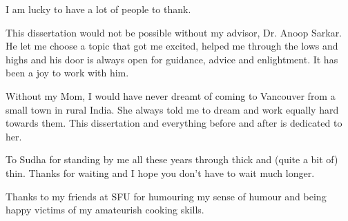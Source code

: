 
%
%


I am lucky to have a lot of people to thank. 

This dissertation would not be possible without my advisor, Dr. Anoop Sarkar. He let me choose a topic that got me excited, helped me through the lows and highs and his door is always open for guidance, advice and enlightment. It has been a joy to work with him. 

Without my Mom, I would have never dreamt of coming to Vancouver from a small town in rural India. She always told me to dream and work equally hard towards them. This dissertation and everything before and after is dedicated to her. 

To Sudha for standing by me all these years through thick and (quite a bit of) thin. Thanks for waiting and I hope you don't have to wait much longer. 

Thanks to my friends at SFU for humouring my sense of humour and being happy victims of my amateurish cooking skills. 










 























